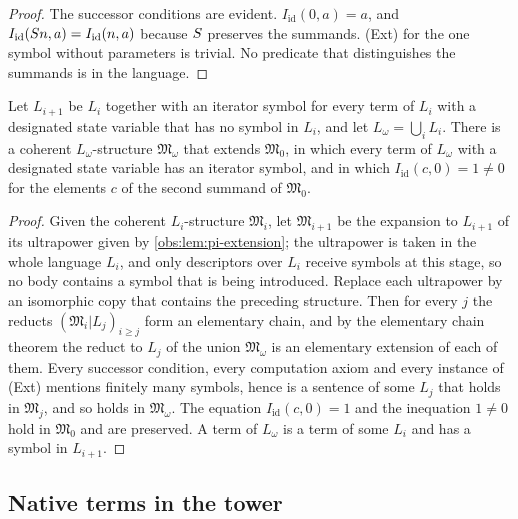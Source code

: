\begin{proof}
The successor conditions are evident. $I_{\mathrm{id}}(0,a)=a$, and
$I_{\mathrm{id}}(S n,a)=I_{\mathrm{id}}(n,a)$ because $S$ preserves the
summands. (Ext) for the one symbol without parameters is trivial. No predicate
that distinguishes the summands is in the language.
\end{proof}

\begin{proposition}
\label{obs:prop:pi-tower}
Let $L_{i+1}$ be $L_i$ together with an iterator symbol for every term of
$L_i$ with a designated state variable that has no symbol in $L_i$, and let
$L_\omega=\bigcup_i L_i$. There is a coherent $L_\omega$-structure
$\mathfrak{M}_\omega$ that extends $\mathfrak{M}_0$, in which every term of
$L_\omega$ with a designated state variable has an iterator symbol, and in
which $I_{\mathrm{id}}(c,0)=1\ne 0$ for the elements $c$ of the second summand
of $\mathfrak{M}_0$.
\end{proposition}

\begin{proof}
Given the coherent $L_i$-structure $\mathfrak{M}_i$, let $\mathfrak{M}_{i+1}$
be the expansion to $L_{i+1}$ of its ultrapower given by
\cref{obs:lem:pi-extension}; the ultrapower is taken in the whole language
$L_i$, and only descriptors over $L_i$ receive symbols at this stage, so no
body contains a symbol that is being introduced. Replace each ultrapower by an
isomorphic copy that contains the preceding structure. Then for every $j$ the
reducts $(\mathfrak{M}_i|L_j)_{i\ge j}$ form an elementary chain, and by the
elementary chain theorem the reduct to $L_j$ of the union
$\mathfrak{M}_\omega$ is an elementary extension of each of them. Every
successor condition, every computation axiom and every instance of (Ext)
mentions finitely many symbols, hence is a sentence of some $L_j$ that holds
in $\mathfrak{M}_j$, and so holds in $\mathfrak{M}_\omega$. The equation
$I_{\mathrm{id}}(c,0)=1$ and the inequation $1\ne 0$ hold in $\mathfrak{M}_0$
and are preserved. A term of $L_\omega$ is a term of some $L_i$ and has a
symbol in $L_{i+1}$.
\end{proof}

\subsection{Native terms in the tower}

